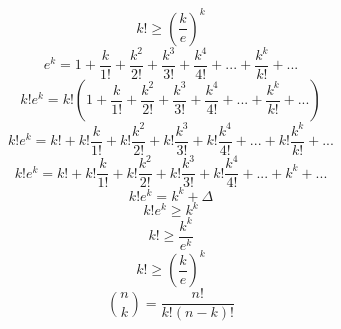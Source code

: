 \documentclass{article}
\begin{document}
	\begin{equation}
	k! \ge (\frac{k}{e})^k
	\end{equation}
	\begin{equation}
	e^k = 1 + \frac{k}{1!} + \frac{k^2}{2!} + \frac{k^3}{3!} + \frac{k^4}{4!} + ... + \frac{k^k}{k!} + ...
	\end{equation}
	\begin{equation}
	k!e^k = k!(1 + \frac{k}{1!} + \frac{k^2}{2!} + \frac{k^3}{3!} + \frac{k^4}{4!} + ... + \frac{k^k}{k!} + ...)
	\end{equation}
	\begin{equation}
	k!e^k = k! + k!\frac{k}{1!} + k!\frac{k^2}{2!} + k!\frac{k^3}{3!} + k!\frac{k^4}{4!} + ... + k!\frac{k^k}{k!} + ...
	\end{equation}
	\begin{equation}
	k!e^k = k! + k!\frac{k}{1!} + k!\frac{k^2}{2!} + k!\frac{k^3}{3!} + k!\frac{k^4}{4!} + ... + k^k + ...
	\end{equation}
	\begin{equation}
	k!e^k = k^k + \Delta
	\end{equation}
	\begin{equation}
	k!e^k \ge k^k
	\end{equation}
	\begin{equation}
	k! \ge \frac{k^k}{e^k}
	\end{equation}
	\begin{equation}
	k! \ge (\frac{k}{e})^k
	\end{equation}
	\begin{equation}
	{n \choose k} = \frac{n!}{k!(n - k)!}
	\end{equation}
\end{document}
